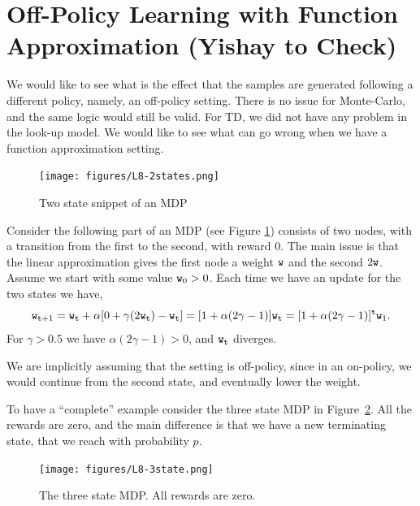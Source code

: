 \section{Off-Policy Learning with Function Approximation (Yishay to Check)}
\label{sec:off_policy_FA}


We would like to see what is the effect that the samples are generated
following a different policy, namely, an off-policy setting. There
is no issue for Monte-Carlo, and the same logic would still be
valid.  For TD, we did not have any problem in the look-up model. We
would like to see what can go wrong when we have a function
approximation setting.


\begin{figure}
  \begin{centering}
  \texttt{[image: figures/L8-2states.png]}\\
  \caption{Two state snippet of an MDP }\label{fig:L8-2state}
  \end{centering}
\end{figure}

Consider the following part of an MDP (see Figure
\ref{fig:L8-2state}) consists of two nodes, with a transition from
the first to the second, with reward $0$. The main issue is that the
linear approximation gives the first node a weight ${\tt w}$ and the
second $2{\tt w}$. Assume we start with some value ${\tt w}_0>0$.
Each time we have an update for the two states we have,
\[
{\tt w}_{{\tt t}+1}={\tt w}_{\tt t} +\alpha[0+\gamma
(2{\tt w}_{\tt t})-{\tt w}_{\tt t}]=[1+\alpha(2\gamma-1)]{\tt w}_{\tt t}=[1+\alpha(2\gamma-1)]^{\tt t}{\tt w}_1.
\]
For $\gamma>0.5$ we have $\alpha(2\gamma-1)>0$, and ${\tt w}_{\tt t}$
diverges.

We are implicitly assuming that the setting is off-policy, since in
an on-policy, we would continue from the second state, and
eventually lower the weight.

To have a ``complete'' example consider the three state MDP in
Figure~\ref{fig:L8-3state}. All the rewards are zero, and the main
difference is that we have a new terminating state, that we reach
with probability $p$.

\begin{figure}
  \begin{centering}
  \texttt{[image: figures/L8-3state.png]}\\
  \caption{The three state MDP. All rewards are zero.}\label{fig:L8-3state}
  \end{centering}
\end{figure}




